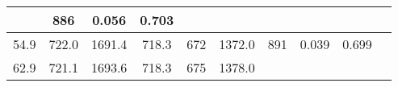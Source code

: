 \documentclass[a4paper,10pt]{article}
\begin{document}
\begin{longtable}{
     |
%    
    c|
%    
    c|
%    
    c|
%    
    c|
%    
    c|
%    
    c|
%    
    c|
%    
    c|
%    
    c|
%    
    c|
%    
    }
%        
        & 886
%        

%        

%        
        & 0.056
%        

%        

%        
        & 0.703
%        

%        
        \\
        \hline

        

%        

%        
        54.9
%        

%        

%        
        & 722.0
%        

%        

%        
        & 1691.4
%        

%        

%        
        & 718.3
%        

%        

%        
        & 672
%        

%        

%        
        & 1372.0
%        

%        

%        
        & 891
%        

%        

%        
        & 0.039
%        

%        

%        
        & 0.699
%        

%        
        \\
        \hline

        

%        

%        
        62.9
%        

%        

%        
        & 721.1
%        

%        

%        
        & 1693.6
%        

%        

%        
        & 718.3
%        

%        

%        
        & 675
%        

%        

%        
        & 1378.0
%        

%        


\end{longtable}
\end{document}
